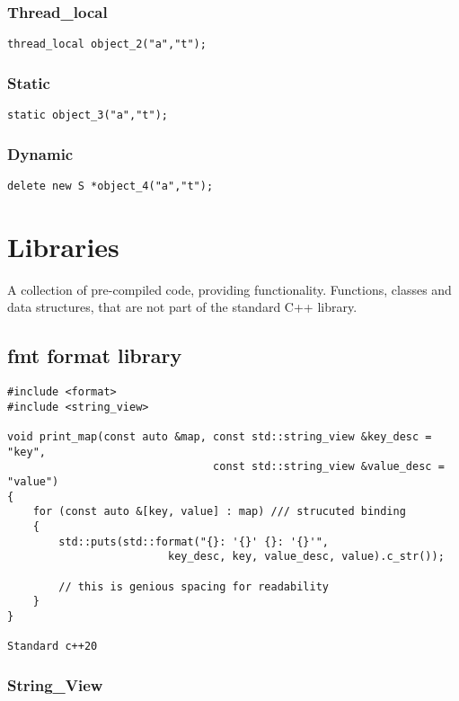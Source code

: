 \documentclass[openany]{report}
\begin{document}
\subsection{Thread\_local}
\begin{verbatim}
thread_local object_2("a","t");
\end{verbatim}

\subsection{Static}
\begin{verbatim}
static object_3("a","t");
\end{verbatim}

\subsection{Dynamic}

\begin{verbatim}
delete new S *object_4("a","t");
\end{verbatim}


\chapter{Libraries}

A collection of pre-compiled code, providing functionality. Functions, classes and data structures,
that are not part of the standard C++ library.

\section{fmt format library}

\begin{verbatim}
#include <format>
#include <string_view>

void print_map(const auto &map, const std::string_view &key_desc = "key",
                                const std::string_view &value_desc = "value")
{
    for (const auto &[key, value] : map) /// strucuted binding
    {
        std::puts(std::format("{}: '{}' {}: '{}'",
                         key_desc, key, value_desc, value).c_str());

        // this is genious spacing for readability
    }
}

Standard c++20
\end{verbatim}
\subsection{String\_View}
\end{document}
